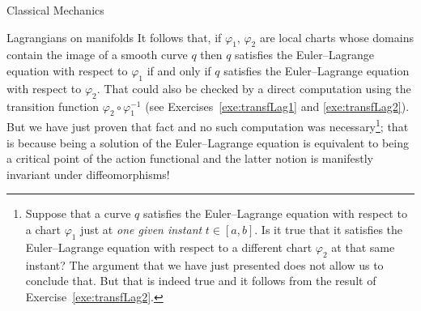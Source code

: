 \documentclass[oneside,a4paper,11pt]{amsbook}
\theoremstyle{remark}\newtheorem{exercise}{Exercise}[chapter]
\theoremstyle{plain}\newtheorem{teo}{Theorem}[section]
\theoremstyle{plain}\newtheorem{lem}[teo]{Lemma}
\theoremstyle{plain}\newtheorem{prop}[teo]{Proposition}
\theoremstyle{plain}\newtheorem{cor}[teo]{Corollary}
\theoremstyle{definition}\newtheorem{defin}[teo]{Definition}
\theoremstyle{remark}\newtheorem{rem}[teo]{Remark}
\theoremstyle{definition}\newtheorem{notation}[teo]{Notation}
\theoremstyle{definition}\newtheorem{convention}[teo]{Convention}
\theoremstyle{definition}\newtheorem{example}[teo]{Example}
\numberwithin{section}{chapter}
\numberwithin{equation}{section}
\begin{document}
\begin{chapter}{Classical Mechanics}
\begin{section}{Lagrangians on manifolds}
It follows that, if $\varphi_1$, $\varphi_2$ are local
charts whose domains contain the image of a smooth curve $q$ then $q$ satisfies the Euler--Lagrange equation with respect to
$\varphi_1$ if and only if $q$ satisfies the Euler--Lagrange equation with respect to $\varphi_2$.
That could also be checked by a direct computation using the transition function $\varphi_2\circ\varphi_1^{-1}$
(see Exercises~\ref{exe:transfLag1} and \ref{exe:transfLag2}). But we
have just proven that fact and no such computation was necessary\footnote{%
Suppose that a curve $q$ satisfies the Euler--Lagrange equation with respect to a chart $\varphi_1$ just
at {\em one given instant\/} $t\in[a,b]$. Is it true that it satisfies the Euler--Lagrange equation with respect to a different
chart $\varphi_2$ at that same instant? The argument that we have just presented does not allow us to conclude that.
But that is indeed true and it follows from the result of Exercise~\ref{exe:transfLag2}.};
that is because being a solution of the Euler--Lagrange equation is equivalent to being a critical
point of the action functional and the latter notion is manifestly invariant under diffeomorphisms!


\end{section}
\end{chapter}
\end{document}
